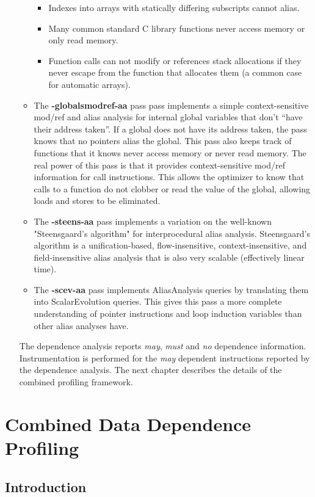 \documentclass[10pt]{report}          %
\begin{document}
\begin{enumerate}
\begin{itemize}
\begin{itemize}
\item Indexes into arrays with statically differing subscripts cannot alias.
\item Many common standard C library functions never access memory or only read memory.
\item Function calls can not modify or references stack allocations if they never escape from the function that allocates them (a common case for automatic arrays).
\end{itemize}
\item The \textbf{-globalsmodref-aa} pass pass implements a simple context-sensitive mod/ref and alias analysis for internal global variables that don’t “have their address taken”. If a global does not have its address taken, the pass knows that no pointers alias the global. This pass also keeps track of functions that it knows never access memory or never read memory. The real power of this pass is that it provides context-sensitive mod/ref information for call instructions. This allows the optimizer to know that calls to a function do not clobber or read the value of the global, allowing loads and stores to be eliminated.
\item The \textbf{-steens-aa} pass implements a variation on the well-known "Steensgaard’s algorithm" for interprocedural alias analysis. Steensgaard’s algorithm is a unification-based, flow-insensitive, context-insensitive, and field-insensitive alias analysis that is also very scalable (effectively linear time). 
\item The \textbf{-scev-aa} pass implements AliasAnalysis queries by translating them into ScalarEvolution queries. This gives this pass a more complete understanding of pointer instructions and loop induction variables than other alias analyses have.
\end{itemize}
The dependence analysis reports \textit{may}, \textit{must} and \textit{no} dependence information.  Instrumentation is performed for the \textit{may} dependent instructions reported by the dependence analysis.  The next chapter describes the details of the combined profiling framework.
\end{enumerate}

\chapter{Combined Data Dependence Profiling}
\label{chapter:cp}

\section{Introduction}
\end{document}
